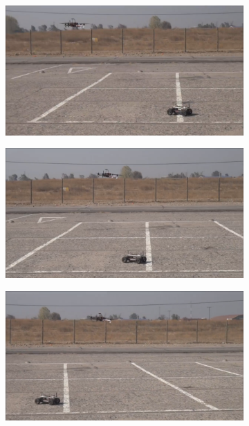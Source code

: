 \begin{figure}[ht!]
  \centering
  \begin{subfigure}[b]{0.8\columnwidth}
    \includegraphics[width=\textwidth]{img/follow_real1.png}
  \end{subfigure}
  \begin{subfigure}[b]{0.8\columnwidth}
    \includegraphics[width=\textwidth]{img/follow_real2.png}
  \end{subfigure}
  \begin{subfigure}[b]{0.8\columnwidth}
    \includegraphics[width=\textwidth]{img/follow_real3.png}

\end{subfigure}
\end{figure}
